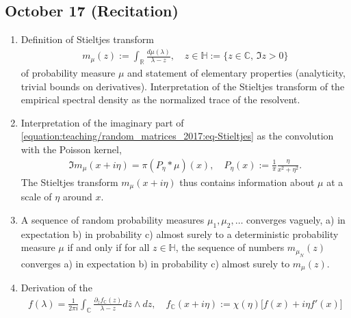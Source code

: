 \documentclass[letterpaper,10pt,english]{sphinxhowto}
\begin{document}
\subsection{October 17 (Recitation)}
\label{\detokenize{teaching/random_matrices_2017:october-17-recitation}}\begin{enumerate}
%
\item {} 
\sphinxAtStartPar
Definition of Stieltjes transform
\begin{equation}\label{equation:teaching/random_matrices_2017:eq-Stieltjes}
\begin{split}
    m_\mu(z):=\int_{\mathbb R} \frac{d\mu(\lambda)}{\lambda-z},\quad z\in\mathbb{H}:=\{z\in\mathbb C,\, \Im z>0\}
    \end{split}
\end{equation}
\sphinxAtStartPar
of probability measure \(\mu\) and statement of elementary properties (analyticity, trivial bounds on derivatives). Interpretation of the Stieltjes transform of the empirical spectral density as the normalized trace of the resolvent.

\item {} 
\sphinxAtStartPar
Interpretation of the imaginary part of \eqref{equation:teaching/random_matrices_2017:eq-Stieltjes} as the convolution with the Poisson kernel,
\begin{equation*}
\begin{split}
    \Im m_\mu(x+i\eta)= \pi (P_\eta\ast \mu)(x),\quad P_\eta(x):=\frac{1}{\pi}\frac{\eta}{x^2+\eta^2}.
    \end{split}
\end{equation*}
\sphinxAtStartPar
The Stieltjes transform \(m_\mu(x+i\eta)\) thus contains information about \(\mu\) at a scale of \(\eta\) around \(x\).

\item {} 
\sphinxAtStartPar
{} A sequence of random probability measures \(\mu_1,\mu_2,\dots\) converges vaguely, a) in expectation b) in probability c) almost surely to a deterministic probability measure \(\mu\) if and only if for all \(z\in\mathbb H\), the sequence of numbers \(m_{\mu_N}(z)\) converges a) in expectation b) in probability c) almost surely to \(m_{\mu}(z)\).

\item {} 
\sphinxAtStartPar
Derivation of the 
\begin{equation*}
\begin{split}
    f(\lambda)=\frac{1}{2\pi i}\int_{\mathbb C} \frac{\partial_{\overline z} f_{\mathbb C} (z)}{\lambda-z}d \overline z \wedge d z,\quad f_{\mathbb C}(x+i\eta):= \chi(\eta)\big[f(x)+i\eta f'(x)\big]
    \end{split}
\end{equation*}
\end{enumerate}
\end{document}

